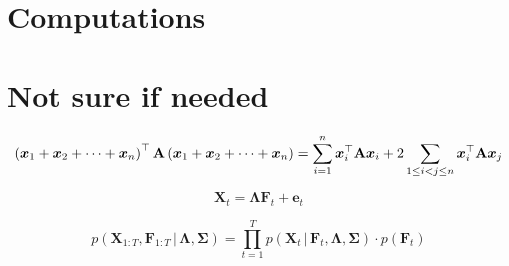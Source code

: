 \clearpage
\section{Computations}

\section{Not sure if needed}
\begin{equation}
	\left( {\bm x}_1 + {\bm x}_2 + \cdots + {\bm x}_n \right)^{\top} {\bf A} \left( {\bm x}_1 + {\bm x}_2 + \cdots + {\bm x}_n \right) = \sum_{i = 1}^n {\bm x}_i^{\top} {\bf A} {\bm x}_i + 2 \sum_{1 \leq i < j \leq n} {\bm x}_i^{\top} {\bf A} {\bm x}_j
\end{equation}

\begin{equation}
	{\bm X}_t = {\bm \Lambda} {\bm F}_t + {\bm e}_t
\end{equation}

\begin{equation}
	p \left( {\bm X}_{1:T}, {\bm F}_{1:T} \, \vert \, {\bm \Lambda}, {\bm \Sigma} \right) = \prod_{t = 1}^T p \left( {\bm X}_t \, \vert \, {\bm F}_t, {\bm \Lambda}, {\bm \Sigma} \right) \cdot p \left( {\bm F}_t \right)
\end{equation}

